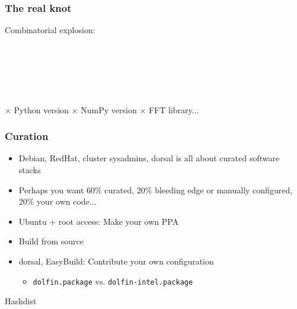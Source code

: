 \documentclass[sans,mathserif]{beamer}
\begin{document}
\begin{frame}
  \frametitle{The real knot}

Combinatorial explosion:

~

~


~

$\times$ Python version $\times$ NumPy version $\times$ FFT library...

\end{frame}


\begin{frame}
  \frametitle{Curation}
  
  \begin{itemize}
  \item<+-> Debian, RedHat, cluster sysadmins, dorsal is all about curated software stacks
  \item<+-> Perhaps you want 60\% curated, 20\% bleeding edge or manually configured, 20\% your own code...
  \item<+-> Ubuntu + root access: Make your own PPA
  \item<+-> Build from source
  \item<+-> dorsal, EasyBuild: Contribute your own configuration
    \begin{itemize}
    \item {\tt dolfin.package} vs. {\tt dolfin-intel.package}
    \end{itemize}
  \end{itemize}
\end{frame}


\begin{frame}
  \begin{center}
    {\LARGE Hashdist}
  \end{center}
\end{frame}

\end{document}
